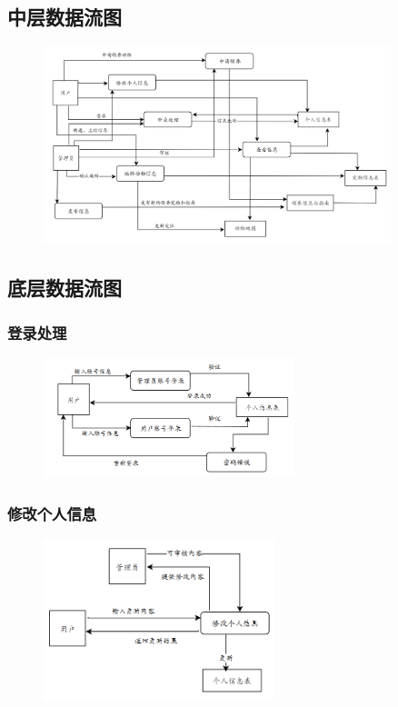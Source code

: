 \documentclass[12pt,a4paper,UTF8]{article}
\begin{document}
\subsection{中层数据流图}

\begin{figure}[H]
  \centering
  \includegraphics[width=0.9\textwidth]{figures/df2.png}
\end{figure}

\subsection{底层数据流图}

\subsubsection{登录处理}

\begin{figure}[H]
  \centering
  \includegraphics[width=0.65\textwidth]{figures/df31.png}
\end{figure}

\subsubsection{修改个人信息}

\begin{figure}[H]
  \centering
  \includegraphics[width=0.6\textwidth]{figures/df32.png}
\end{figure}
\end{document}
